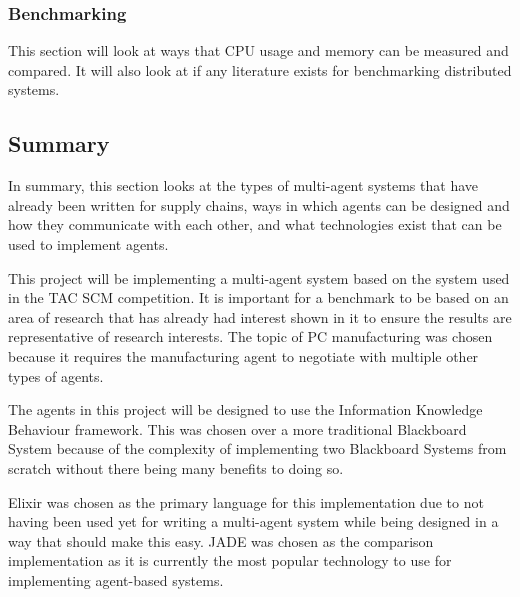 \subsubsection{Benchmarking}

This section will look at ways that CPU usage and memory can be measured and compared.
It will also look at if any literature exists for benchmarking distributed systems.

\subsection{Summary}

In summary, this section looks at the types of multi-agent systems that have already been written for supply chains, ways in which agents can be designed and how they communicate with each other, and what technologies exist that can be used to implement agents.

This project will be implementing a multi-agent system based on the system used in the TAC SCM competition.
It is important for a benchmark to be based on an area of research that has already had interest shown in it to ensure the results are representative of research interests.
The topic of PC manufacturing was chosen because it requires the manufacturing agent to negotiate with multiple other types of agents.

The agents in this project will be designed to use the Information Knowledge Behaviour framework.
This was chosen over a more traditional Blackboard System because of the complexity of implementing two Blackboard Systems from scratch without there being many benefits to doing so.

Elixir was chosen as the primary language for this implementation due to not having been used yet for writing a multi-agent system while being designed in a way that should make this easy.
JADE was chosen as the comparison implementation as it is currently the most popular technology to use for implementing agent-based systems.

